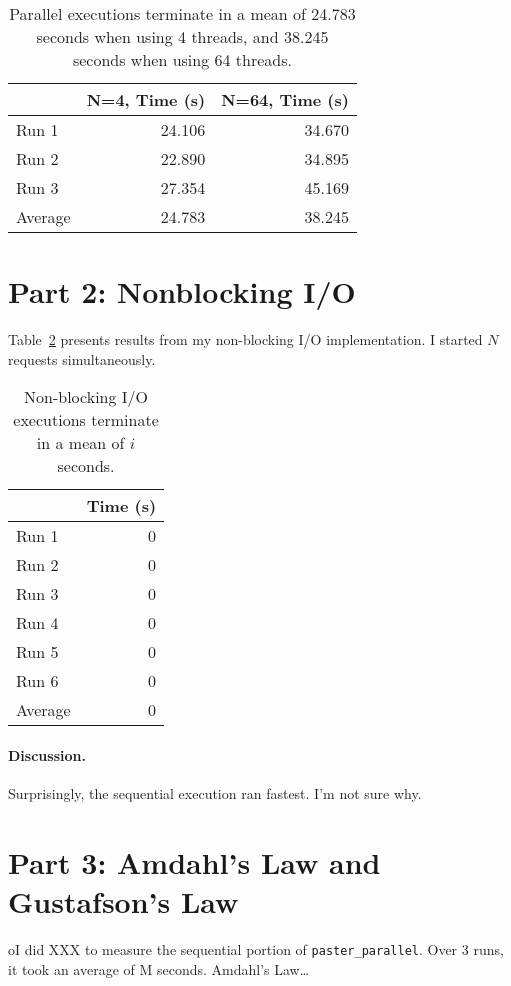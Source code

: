 \documentclass[12pt]{article}
\begin{document}
\begin{table}[H]
  \centering
  \begin{tabular}{lrr}
    & {\bf N=4, Time (s)} & {\bf N=64, Time (s)} \\
    \hline
    Run 1 & 24.106 & 34.670 \\
    Run 2 & 22.890 & 34.895 \\
    Run 3 & 27.354 & 45.169 \\
    \hline
    Average & 24.783 & 38.245 \\
  \end{tabular}
  \caption{\label{tbl_parallel}Parallel executions terminate in a mean of 24.783 seconds when using 4 threads, and 38.245 seconds when using 64 threads.}
\end{table}

\section*{Part 2: Nonblocking I/O}

Table~\ref{tbl_nbio} presents results from my non-blocking I/O implementation. I started $N$ requests
simultaneously.

\begin{table}[H]
  \centering
  \begin{tabular}{lr}
    & {\bf Time (s)} \\
    \hline
    Run 1 & 0 \\
    Run 2 & 0 \\
    Run 3 & 0 \\
    Run 4 & 0 \\
    Run 5 & 0 \\
    Run 6 & 0 \\
    \hline
    Average & 0 \\
  \end{tabular}
  \caption{\label{tbl_nbio}Non-blocking I/O executions terminate in a mean of $i$ seconds.}
\end{table}

\paragraph{Discussion.} Surprisingly, the sequential execution ran fastest. I'm
not sure why.

\section*{Part 3: Amdahl's Law and Gustafson's Law}
oI did XXX to measure the sequential portion of {\tt paster\_parallel}. Over 3 runs,
it took an average of M seconds. Amdahl's Law\ldots
\end{document}
